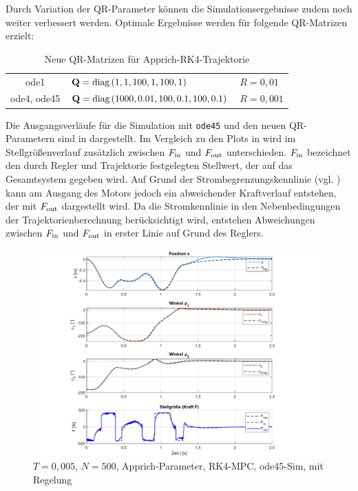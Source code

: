 Durch Variation der QR-Parameter können die Simulationsergebnisse zudem noch weiter verbessert werden. Optimale Ergebnisse werden für folgende QR-Matrizen erzielt:
\begin{table}
	\centering
	\caption{Neue QR-Matrizen für Apprich-RK4-Trajektorie}
		\begin{tabular}{cll}
			\toprule
			ode1        & ${\boldsymbol{\mathrm{Q}}} = \mathrm{diag}\left(1, 1, 100, 1, 100, 1\right)$           & $R=0,01$ \\
			ode4, ode45 & ${\boldsymbol{\mathrm{Q}}} = \mathrm{diag}\left(1000, 0.01, 100, 0.1, 100, 0.1\right)$ & $R=0,001$ \\
			\bottomrule
		\end{tabular}
	\label{tab:NeueQR}
\end{table}

Die Ausgangsverläufe für die Simulation mit \texttt{ode45} und den neuen QR-Parametern sind in  dargestellt. Im Vergleich zu den Plots in  wird im Stellgrößenverlauf zusätzlich zwischen $F_{\mathrm{in}}$ und $F_{\mathrm{out}}$ unterschieden. $F_{\mathrm{in}}$ bezeichnet den durch Regler und Trajektorie festgelegten Stellwert, der auf das Gesamtsystem gegeben wird. Auf Grund der Strombegrenzungskennlinie (vgl. ) kann am Ausgang des Motors jedoch ein abweichender Kraftverlauf entstehen, der mit $F_{\mathrm{out}}$ dargestellt wird. Da die Stromkennlinie in den Nebenbedingungen der Trajektorienberechnung berücksichtigt wird, entstehen Abweichungen zwischen $F_{\mathrm{in}}$ und $F_{\mathrm{out}}$ in erster Linie auf Grund des Reglers. 

\begin{figure}
	\centering
		\includegraphics[scale=\scaleyplots]{Bilder/Trajektorien/F410T0.005_app_rk4_ode45_TFR_QR-neu.pdf}
	\caption{$T=0,005$, $N=500$, Apprich-Parameter, RK4-MPC, ode45-Sim, mit Regelung}
	\label{fig:F410T0.005_app_rk4_ode45_TFR_QR-neu}
\end{figure}



